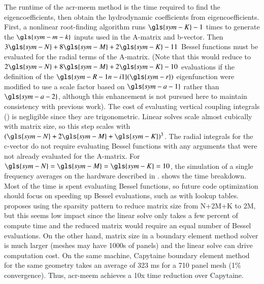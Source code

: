 The runtime of the \gls{acr-meem} method is the time required to find the eigencoefficients, then obtain the hydrodynamic coefficients from eigencoefficients.
First, a nonlinear root-finding algorithm runs $\gls{sym-K}-1$ times to generate the $\gls{sym-m-k}$ inputs used in the A-matrix and b-vector.
Then $3\gls{sym-N}+8\gls{sym-M}+2\gls{sym-K}-11$ Bessel functions must be evaluated for the radial terms of the A-matrix.
 (Note that this would reduce to $2\gls{sym-N}+8\gls{sym-M}+2\gls{sym-K}-10$ evaluations if the definition of the $\gls{sym-R-1n-i1}(\gls{sym-r})$ eigenfunction were modified to use a scale factor based on $\gls{sym-a-1}$ rather than $\gls{sym-a-2}$, although this enhancement is not pursued here to maintain consistency with previous work).
The cost of evaluating vertical coupling integrals () is negligible since they are trigonometric.
Linear solves scale almost cubically with matrix size, so this step scales with $(\gls{sym-N}+2\gls{sym-M}+\gls{sym-K})^3$.
The radial integrals for the c-vector do not require evaluating Bessel functions with any arguments that were not already evaluated for the A-matrix.
For $\gls{sym-N}=\gls{sym-M}=\gls{sym-K}=10$, the simulation of a single frequency averages \resultsAOR[MEEMRuntime] on the hardware described in .
 shows the time breakdown.
Most of the time is spent evaluating Bessel functions, so future code optimization should focus on speeding up Bessel evaluations, such as with lookup tables.
\citet{chau_inertia_2012} proposes using the sparsity pattern to reduce matrix size from N+2M+K to 2M, but this seems low impact since the linear solve only takes a few percent of compute time and the reduced matrix would require an equal number of Bessel evaluations.
On the other hand, matrix size in a boundary element method solver is much larger (meshes may have 1000s of panels) and the linear solve can drive computation cost.
On the same machine, Capytaine boundary element method for the same geometry takes an average of 323 ms for a 710 panel mesh (1\% convergence). %
Thus, \gls{acr-meem} achieves a 10x time reduction over Capytaine.
